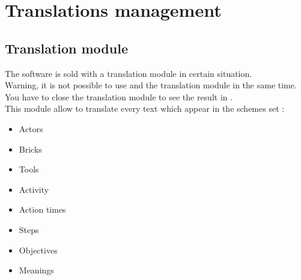 \chapter{Translations management}

\section{Translation module}
The software \tria is sold with a translation module in certain situation.\\

Warning, it is not possible to use \tria and the translation module in the same time. You have to close the translation module to see the result in \tria.\\

This module allow to translate every text which appear in the schemes set : \\

\begin{itemize}
\item Actors
\item Bricks
\item Tools
\item Activity %
\item Action times
\item Steps
\item Objectives
\item Meanings\\
\end{itemize}

